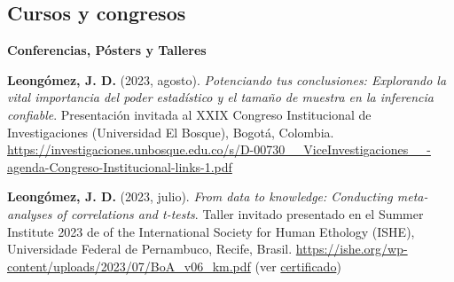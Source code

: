 \documentclass[11pt,a4paper,]{awesome-cv}
\begin{document}
\hypertarget{cursos-y-congresos}{%
\subsection{Cursos y congresos}\label{cursos-y-congresos}}

\begin{cventries}
\end{cventries}

\blacktriangleright\blacktriangleright\blacktriangleright\space \textbf{Conferencias, Pósters y Talleres}

\begingroup
\footnotesize
\setlength{\parindent}{-0.5in}
\setlength{\leftskip}{0.5in}

\textbf{Leongómez, J. D.} (2023, agosto). \emph{Potenciando tus
conclusiones: Explorando la vital importancia del poder estadístico y el
tamaño de muestra en la inferencia confiable}. Presentación invitada al
XXIX Congreso Institucional de Investigaciones (Universidad El Bosque),
Bogotá, Colombia.
\url{https://investigaciones.unbosque.edu.co/s/D-00730__ViceInvestigaciones__-agenda-Congreso-Institucional-links-1.pdf}

\textbf{Leongómez, J. D.} (2023, julio). \emph{From data to knowledge:
Conducting meta-analyses of correlations and t-tests}. Taller invitado
presentado en el Summer Institute 2023 de of the International Society
for Human Ethology (ISHE), Universidade Federal de Pernambuco, Recife,
Brasil. \url{https://ishe.org/wp-content/uploads/2023/07/BoA_v06_km.pdf}
(ver
\href{https://jdleongomez.info/es/files/Cert_ISHE_2023.pdf}{certificado})
\end{document}
